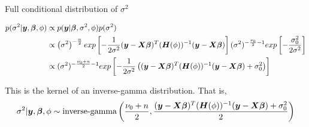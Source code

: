 \documentclass[12pt]{article}
\newcommand{\bfy}{\mbox{\boldmath $y$}}
\newcommand{\bfX}{\mbox{\boldmath $X$}}
\newcommand{\bfb}{\mbox{\boldmath $\beta$}}
\newcommand{\bfH}{\mbox{\boldmath $H$}}
\begin{document}
\begin{landscape}
	\begin{center}
		Full conditional distribution of $\sigma^2$
	\end{center}
	\begin{equation*}
	\begin{split}
	p(\sigma^2|\bfy, \bfb, \phi) &\propto p(\bfy|\bfb, \sigma^2, \phi)p(\sigma^2) \\
	&\propto \left(\sigma^2\right)^{-\frac{n}{2}} exp \left[-\frac{1}{2\sigma^2} (\bfy - \bfX\bfb)^T(\bfH(\phi))^{-1} (\bfy - \bfX\bfb)\right] (\sigma^2)^{-\frac{\nu_0}{2} - 1} exp\left[-\frac{\sigma_0^2}{2\sigma^2}\right] \\
	&\propto (\sigma^2)^{-\frac{\nu_0+n}{2} - 1} exp\left[-\frac{1}{2\sigma^2} \left((\bfy - \bfX\bfb)^T(\bfH(\phi))^{-1} (\bfy - \bfX\bfb) + \sigma_0^2 \right)\right]
	\end{split}
	\end{equation*}
	
	This is the kernel of an inverse-gamma distribution. That is,
	\begin{equation*}
	\begin{split}
	\sigma^2|\bfy, \bfb, \phi \sim \text{inverse-gamma}\left(\frac{\nu_0 + n}{2}, \frac{(\bfy - \bfX\bfb)^T(\bfH(\phi))^{-1} (\bfy - \bfX\bfb) + \sigma_0^2}{2} \right)
	\end{split}
	\end{equation*}
\end{landscape}	
\end{document}
